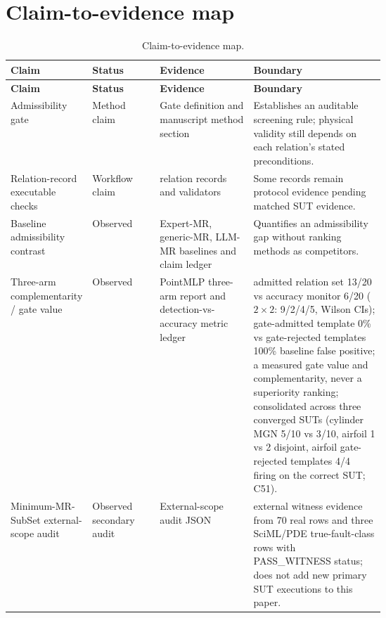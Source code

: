 
\renewcommand{\thetable}{A\arabic{table}}
\setcounter{table}{0}
\section{Claim-to-evidence map}
\label{app:claim-evidence}

{
\scriptsize
\setlength{\tabcolsep}{1.5pt}
\begin{xltabular}{\linewidth}{@{}>{\raggedright\arraybackslash}p{0.19\linewidth}>{\raggedright\arraybackslash}p{0.18\linewidth}>{\raggedright\arraybackslash}p{0.25\linewidth}Y@{}}
\caption{Claim-to-evidence map.}\label{tab:claim-evidence}\\
\toprule
\textbf{Claim} & \textbf{Status} & \textbf{Evidence} & \textbf{Boundary} \\
\midrule
\endfirsthead
\toprule
\textbf{Claim} & \textbf{Status} & \textbf{Evidence} & \textbf{Boundary} \\
\midrule
\endhead
\bottomrule
\endlastfoot
Admissibility gate & Method claim & Gate definition and manuscript method section & Establishes an auditable screening rule; physical validity still depends on each relation's stated preconditions. \\
Relation-record executable checks & Workflow claim & relation records and validators & Some records remain protocol evidence pending matched SUT evidence. \\
Baseline admissibility contrast & Observed & Expert-MR, generic-MR, LLM-MR baselines and claim ledger & Quantifies an admissibility gap without ranking methods as competitors. \\
Three-arm complementarity / gate value & Observed & PointMLP three-arm report and detection-vs-accuracy metric ledger & admitted relation set 13/20 vs accuracy monitor 6/20 ($2\times2$: 9/2/4/5, Wilson CIs); gate-admitted template 0\% vs gate-rejected templates 100\% baseline false positive; a measured gate value and complementarity, never a superiority ranking; consolidated across three converged SUTs (cylinder MGN 5/10 vs 3/10, airfoil 1 vs 2 disjoint, airfoil gate-rejected templates 4/4 firing on the correct SUT; C51). \\
Minimum-MR-SubSet external-scope audit & Observed secondary audit & External-scope audit JSON & external witness evidence from 70 real rows and three SciML/PDE true-fault-class rows with PASS\_WITNESS status; does not add new primary SUT executions to this paper. \\

\end{xltabular}}
